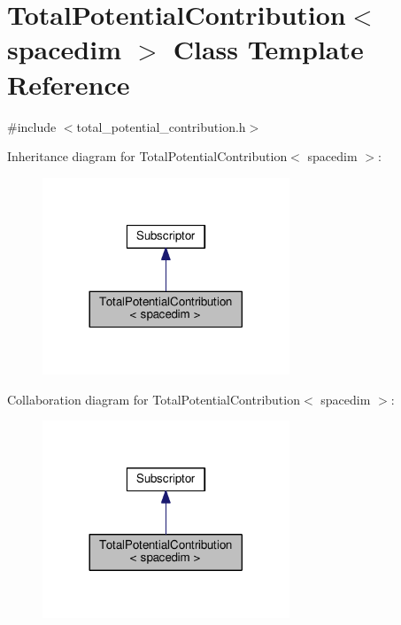 \hypertarget{class_total_potential_contribution}{}\section{Total\+Potential\+Contribution$<$ spacedim $>$ Class Template Reference}
\label{class_total_potential_contribution}


{\ttfamily \#include $<$total\+\_\+potential\+\_\+contribution.\+h$>$}



Inheritance diagram for Total\+Potential\+Contribution$<$ spacedim $>$\+:\nopagebreak
\begin{figure}[H]
\begin{center}
\leavevmode
\includegraphics[width=209pt]{class_total_potential_contribution__inherit__graph}
\end{center}
\end{figure}


Collaboration diagram for Total\+Potential\+Contribution$<$ spacedim $>$\+:\nopagebreak
\begin{figure}[H]
\begin{center}
\leavevmode
\includegraphics[width=209pt]{class_total_potential_contribution__coll__graph}
\end{center}
\end{figure}
